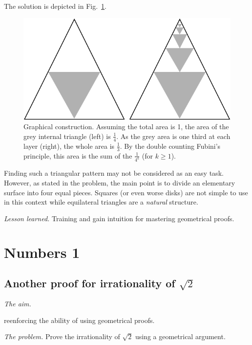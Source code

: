 The solution is depicted in Fig.~\ref{Fig:Sumgeo1sur4}. 
\begin{figure}
\begin{center}
        \includegraphics[scale=0.3]{FiguresArithmetic/SumGeometric1sur4}
        \caption{Graphical construction. Assuming the total area is 1, the area of the grey internal triangle (left) is $\frac{1}{4}$.
        As the grey area is one third at each layer (right), the whole area is $\frac{1}{3}$.
        By the double counting Fubini's principle, this area is the sum of the $\frac{1}{4^k}$ (for $k \geq 1$).}
        \label{Fig:Sumgeo1sur4}
\end{center}
\end{figure}

Finding such a triangular pattern may not be considered as an easy task.
However, as stated in the problem, the main point is to divide an elementary surface
into four equal pieces. 
Squares (or even worse disks) are not simple to use in this context while equilateral triangles 
are a \textit{natural} structure. 
\medskip

\noindent \textit{Lesson learned.}
Training and gain intuition for mastering geometrical proofs. 


\section{Numbers 1}

\subsection{Another proof for irrationality of $\sqrt{2}$}

\noindent \textit{The aim.}

reenforcing the ability of using geometrical proofs.
\medskip

\noindent \textit{The problem.}
Prove the irrationality of $\sqrt{2}$ using a geometrical argument.
\medskip

